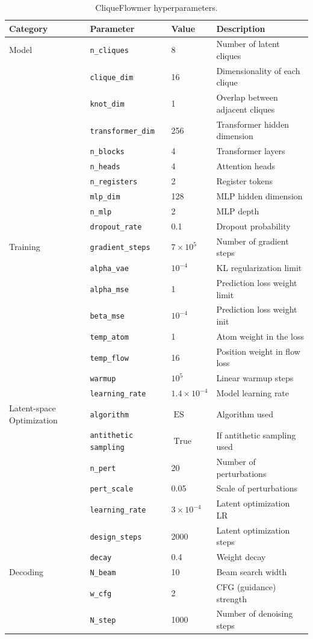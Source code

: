 \documentclass{article}
\theoremstyle{plain}
\theoremstyle{definition}
\theoremstyle{remark}
\begin{document}
\begin{table}
\centering
\caption{CliqueFlowmer hyperparameters.}
\label{tab:hyperparams}
\small
\setlength{\tabcolsep}{4pt}
\begin{tabular}{l l l l}
\toprule
\textbf{Category} & \textbf{Parameter} & \textbf{Value} & \textbf{Description} \\
\midrule
Model & \texttt{n\_cliques} & 8 & Number of latent cliques \\
 & \texttt{clique\_dim} & 16 & Dimensionality of each clique \\
 & \texttt{knot\_dim} & 1 & Overlap between adjacent cliques \\
 & \texttt{transformer\_dim} & 256 & Transformer hidden dimension \\
 & \texttt{n\_blocks} & 4 & Transformer layers \\
 & \texttt{n\_heads} & 4 & Attention heads \\
 & \texttt{n\_registers} & 2 & Register tokens \\
 & \texttt{mlp\_dim} & 128 & MLP hidden dimension \\
 & \texttt{n\_mlp} & 2 & MLP depth \\
 & \texttt{dropout\_rate} & 0.1 & Dropout probability \\
\midrule
Training & \texttt{gradient\_steps} & $7 \times 10^{5}$ & Number of gradient steps\\
 & \texttt{alpha\_vae} & $10^{-4}$ & KL regularization limit \\
 & \texttt{alpha\_mse} & 1 & Prediction loss weight limit \\
 & \texttt{beta\_mse} & $10^{-4}$ & Prediction loss weight init \\
 & \texttt{temp\_atom} & 1 & Atom weight in the loss \\
 & \texttt{temp\_flow} & 16 & Position weight in flow loss \\
 & \texttt{warmup} & $10^{5}$ & Linear warmup steps \\
 & \texttt{learning\_rate} & $1.4\times10^{-4}$ & Model learning rate \\
\midrule
Latent-space Optimization & \texttt{algorithm} & $\operatorname{ES}$ & Algorithm used  \\
 & \texttt{antithetic sampling} & $\operatorname{True}$ & If antithetic sampling used \\ 
 & \texttt{n\_pert} & 20 & Number of perturbations\\
 & \texttt{pert\_scale} & 0.05 & Scale of perturbations \\
 & \texttt{learning\_rate} & $3\times10^{-4}$ & Latent optimization LR \\
 & \texttt{design\_steps} & 2000 & Latent optimization steps \\
 & \texttt{decay} & 0.4 & Weight decay \\
 \midrule
Decoding & \texttt{N\_beam} & 10 & Beam search width \\
& \texttt{w\_cfg} & 2 & CFG (guidance) strength \\ 
& \texttt{N\_step} & 1000 & Number of denoising steps\\
\bottomrule
\end{tabular}
\end{table}
\end{document}
